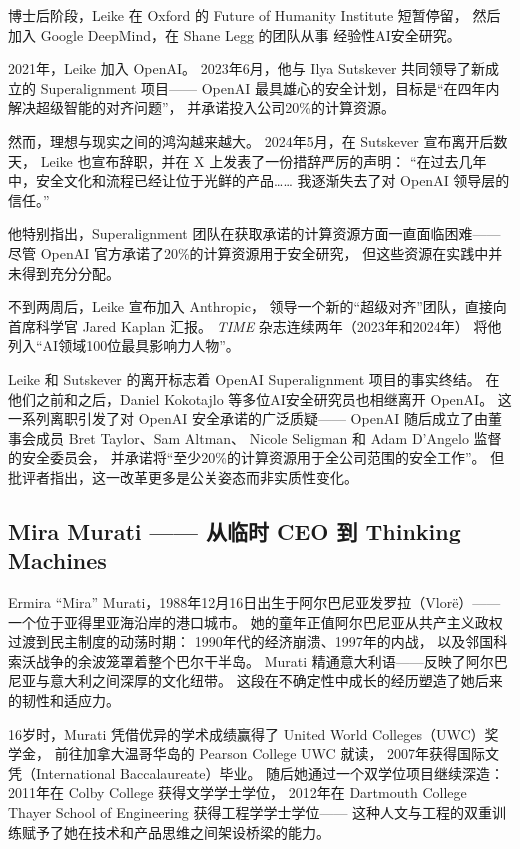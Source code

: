 博士后阶段，Leike 在 Oxford 的 Future of Humanity Institute 短暂停留，
然后加入 Google DeepMind，在 Shane Legg 的团队从事
经验性AI安全研究。

2021年，Leike 加入 OpenAI。
2023年6月，他与 Ilya Sutskever 共同领导了新成立的 Superalignment 项目——
OpenAI 最具雄心的安全计划，目标是``在四年内解决超级智能的对齐问题''，
并承诺投入公司20\%的计算资源。

然而，理想与现实之间的鸿沟越来越大。
2024年5月，在 Sutskever 宣布离开后数天，
Leike 也宣布辞职，并在 X 上发表了一份措辞严厉的声明：
``在过去几年中，安全文化和流程已经让位于光鲜的产品……
我逐渐失去了对 OpenAI 领导层的信任。''

他特别指出，Superalignment 团队在获取承诺的计算资源方面一直面临困难——
尽管 OpenAI 官方承诺了20\%的计算资源用于安全研究，
但这些资源在实践中并未得到充分分配。

不到两周后，Leike 宣布加入 Anthropic，
领导一个新的``超级对齐''团队，直接向首席科学官 Jared Kaplan 汇报。
\emph{TIME} 杂志连续两年（2023年和2024年）
将他列入``AI领域100位最具影响力人物''。

\begin{warnbox}
Leike 和 Sutskever 的离开标志着 OpenAI Superalignment 项目的事实终结。
在他们之前和之后，Daniel Kokotajlo 等多位AI安全研究员也相继离开 OpenAI。
这一系列离职引发了对 OpenAI 安全承诺的广泛质疑——
OpenAI 随后成立了由董事会成员 Bret Taylor、Sam Altman、
Nicole Seligman 和 Adam D'Angelo 监督的安全委员会，
并承诺将``至少20\%的计算资源用于全公司范围的安全工作''。
但批评者指出，这一改革更多是公关姿态而非实质性变化。
\end{warnbox}


\subsection{Mira Murati —— 从临时 CEO 到 Thinking Machines}
\label{subsec:mira-murati}

Ermira ``Mira'' Murati，1988年12月16日出生于阿尔巴尼亚发罗拉（Vlor\"{e}）——
一个位于亚得里亚海沿岸的港口城市。
她的童年正值阿尔巴尼亚从共产主义政权过渡到民主制度的动荡时期：
1990年代的经济崩溃、1997年的内战，
以及邻国科索沃战争的余波笼罩着整个巴尔干半岛。
Murati 精通意大利语——反映了阿尔巴尼亚与意大利之间深厚的文化纽带。
这段在不确定性中成长的经历塑造了她后来的韧性和适应力。

16岁时，Murati 凭借优异的学术成绩赢得了
United World Colleges（UWC）奖学金，
前往加拿大温哥华岛的 Pearson College UWC 就读，
2007年获得国际文凭（International Baccalaureate）毕业。
随后她通过一个双学位项目继续深造：
2011年在 Colby College 获得文学学士学位，
2012年在 Dartmouth College Thayer School of Engineering
获得工程学学士学位——
这种人文与工程的双重训练赋予了她在技术和产品思维之间架设桥梁的能力。

